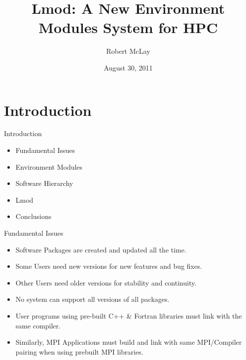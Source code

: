 \documentclass{beamer}
\title{Lmod: A New Environment Modules System for HPC}
\author{Robert McLay}
\institute{The Texas Advanced Computing Center}
\date{August 30, 2011}  %
\begin{document}
\begin{frame}
  \titlepage
\end{frame}

\section{Introduction}

\begin{frame}{Introduction}
  \begin{itemize}
    \item Fundamental Issues
    \item Environment Modules
    \item Software Hierarchy
    \item Lmod
    \item Conclusions
  \end{itemize}
\end{frame}


\begin{frame}{Fundamental Issues}
  \begin{itemize}
    \item Software Packages are created and updated all the time.
    \item Some Users need new versions for new features and bug fixes.
    \item Other Users need older versions for stability and continuity.
    \item No system can support all versions of all packages.
    \item User programs using pre-built C++ \& Fortran libraries must
      link with the same compiler.
    \item Similarly, MPI Applications must build and link with same
      MPI/Compiler pairing when using prebuilt MPI libraries.
  \end{itemize}
\end{frame}
\end{document}
